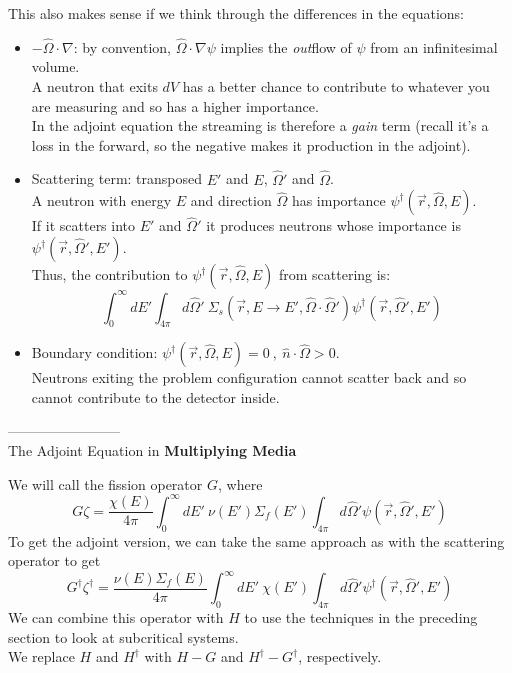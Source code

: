\documentclass[12pt]{article}
\newcommand{\rvec}{\ensuremath{\vec{r}}}
\newcommand{\vOmega}{\ensuremath{\hat{\Omega}}}
\begin{document}
This also makes sense if we think through the differences in the equations:
\begin{itemize}
\item $-\vOmega \cdot \nabla$: by convention, $\vOmega \cdot \nabla \psi$ implies the \textit{out}flow of $\psi$ from an infinitesimal volume.\\
A neutron that exits $dV$ has a better chance to contribute to whatever you are measuring and so has a higher importance. \\
In the adjoint equation the streaming is therefore a \textit{gain} term (recall it's a loss in the forward, so the negative makes it production in the adjoint).
%
\item Scattering term: transposed $E'$ and $E$, $\vOmega'$ and $\vOmega$. \\
A neutron with energy $E$ and direction  $\vOmega$ has importance $\psi^{\dagger}(\rvec, \vOmega, E)$. \\
If it scatters into $E'$ and $\vOmega'$ it produces neutrons whose importance is $\psi^{\dagger}(\rvec, \vOmega', E')$.\\
Thus, the contribution to $\psi^{\dagger}(\rvec, \vOmega, E)$ from scattering is:
\[
\int_0^{\infty} dE' \int_{4\pi} d\vOmega' \:\Sigma_s(\rvec, E \rightarrow E', \vOmega \cdot \vOmega')\psi^{\dagger}(\rvec, \vOmega', E')
\]
\item Boundary condition: $\psi^{\dagger}(\rvec, \vOmega, E) = 0\:, \: \hat{n}\cdot \vOmega > 0$.\\
Neutrons exiting the problem configuration cannot scatter back and so cannot contribute to the detector inside. 
\end{itemize}

------------------------\\
The Adjoint Equation in \textbf{Multiplying Media}

We will call the fission operator $G$, where
\[
G \zeta = \frac{\chi(E)}{4\pi}\int_0^{\infty} dE' \: \nu(E') \Sigma_f(E') \int_{4\pi} d\vOmega' \psi(\rvec, \vOmega', E')
\]
To get the adjoint version, we can take the same approach as with the scattering operator to get
\[
G^{\dagger} \zeta^{\dagger} = \frac{\nu(E) \Sigma_f(E)}{4\pi}\int_0^{\infty} dE' \: \chi(E') \int_{4\pi} d\vOmega' \psi^{\dagger}(\rvec, \vOmega', E')
\]
We can combine this operator with $H$ to use the techniques in the preceding section to look at subcritical systems.\\
We replace $H$ and $H^{\dagger}$ with $H-G$ and $H^{\dagger}-G^{\dagger}$, respectively.\\
\end{document}
